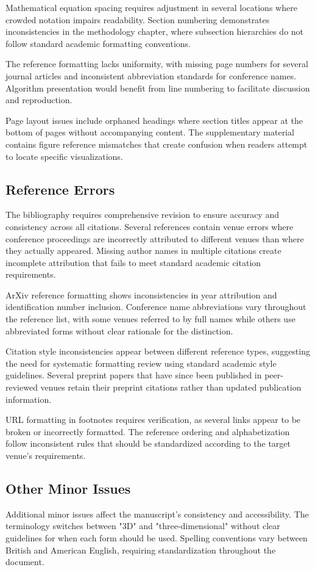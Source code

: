 Mathematical equation spacing requires adjustment in several locations where crowded notation impairs readability. Section numbering demonstrates inconsistencies in the methodology chapter, where subsection hierarchies do not follow standard academic formatting conventions.

The reference formatting lacks uniformity, with missing page numbers for several journal articles and inconsistent abbreviation standards for conference names. Algorithm presentation would benefit from line numbering to facilitate discussion and reproduction.

Page layout issues include orphaned headings where section titles appear at the bottom of pages without accompanying content. The supplementary material contains figure reference mismatches that create confusion when readers attempt to locate specific visualizations.

\subsection{Reference Errors}
The bibliography requires comprehensive revision to ensure accuracy and consistency across all citations. Several references contain venue errors where conference proceedings are incorrectly attributed to different venues than where they actually appeared. Missing author names in multiple citations create incomplete attribution that fails to meet standard academic citation requirements.

ArXiv reference formatting shows inconsistencies in year attribution and identification number inclusion. Conference name abbreviations vary throughout the reference list, with some venues referred to by full names while others use abbreviated forms without clear rationale for the distinction.

Citation style inconsistencies appear between different reference types, suggesting the need for systematic formatting review using standard academic style guidelines. Several preprint papers that have since been published in peer-reviewed venues retain their preprint citations rather than updated publication information.

URL formatting in footnotes requires verification, as several links appear to be broken or incorrectly formatted. The reference ordering and alphabetization follow inconsistent rules that should be standardized according to the target venue's requirements.

\subsection{Other Minor Issues}
Additional minor issues affect the manuscript's consistency and accessibility. The terminology switches between "3D" and "three-dimensional" without clear guidelines for when each form should be used. Spelling conventions vary between British and American English, requiring standardization throughout the document.

